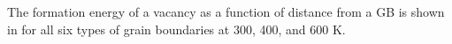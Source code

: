 \documentclass[review]{elsarticle}
\begin{document}
The formation energy of a vacancy as a function of distance from a GB is shown in  for all six types of grain boundaries at 300, 400, and 600 K.

\begin{figure}[h!]
\centering
{} 
\\

\end{figure}
\end{document}
